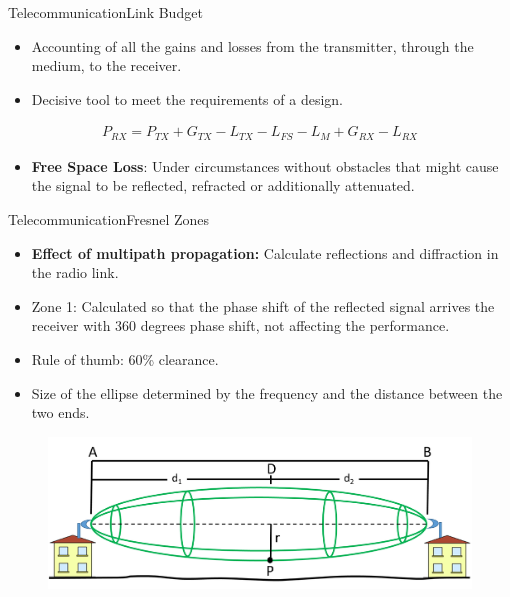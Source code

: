 \begin{frame}{Telecommunication}{Link Budget}
      \begin{block}{}
        \begin{itemize}
          \item {Accounting of all the gains and losses from the transmitter, through the medium, to the receiver.}
          \item {Decisive tool to meet the requirements of a design.}
        \end{itemize}
      \end{block}
    \begin{align*}      
        P_{RX} = P_{TX} + G_{TX} - L_{TX} - L_{FS} - L_{M} + G_{RX} - L_{RX}
    \end{align*}
     \begin{itemize}
     \item{\textbf{Free Space Loss}: Under circumstances without obstacles that might cause the signal to be reflected, refracted or additionally attenuated.}
      \end{itemize}

\end{frame}

\begin{frame}{Telecommunication}{Fresnel Zones}
   \begin{block}{}
        \begin{itemize}
          \item {\textbf{Effect of multipath propagation:} Calculate reflections and diffraction in the radio link.}
          \item {Zone 1: Calculated so that the phase shift of the reflected signal arrives the receiver with 360 degrees phase shift, not affecting the performance.}
          \item {Rule of thumb: 60\% clearance.}
          \item {Size of the ellipse determined by the frequency and the distance between the two ends.}
        \end{itemize}
      \end{block}
      \begin{figure}
        \includegraphics[scale=0.3]{figures/fresnel_zone.png}
      \end{figure}

\end{frame}